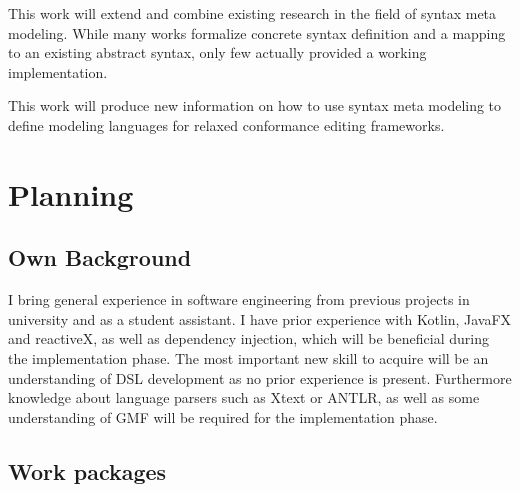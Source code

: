 \documentclass[10pt,a4paper,oneside]{scrartcl}
\newcommand\hint[2]{
\ifthenelse{\boolean{showhints}}{
\begin{center}
\colorbox{black!10}{
\begin{minipage}{.963\textwidth}
#2\hfill\textbf{#1}
\end{minipage}
}\end{center}}{}
}
\begin{document}

This work will extend and combine existing research in the field of syntax meta modeling. While many works formalize concrete syntax definition and a mapping to an existing abstract syntax, only few actually provided a working implementation.

This work will produce new information on how to use syntax meta modeling to define modeling languages for relaxed conformance editing frameworks.


\section{Planning}
\label{sec:planning}

\subsection{Own Background}
\label{sub:background}


I bring general experience in software engineering from previous projects in university and as a student assistant. I have prior experience with Kotlin, JavaFX and reactiveX, as well as dependency injection, which will be beneficial during the implementation phase. The most important new skill to acquire will be an understanding of DSL development as no prior experience is present. Furthermore knowledge about language parsers such as Xtext or ANTLR, as well as some understanding of GMF will be required for the implementation phase.



\subsection{Work packages}
\label{sub:wp}

\end{document}

